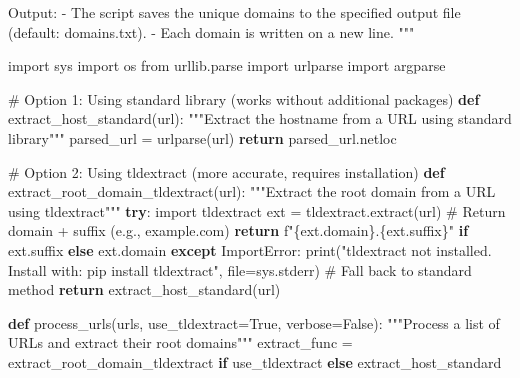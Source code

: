 \documentclass[
  titlepage]{article}
\newenvironment{Shaded}{\begin{snugshade}}{\end{snugshade}}
\newcommand{\BuiltInTok}[1]{\textcolor[rgb]{0.00,0.23,0.31}{#1}}
\newcommand{\CommentTok}[1]{\textcolor[rgb]{0.37,0.37,0.37}{#1}}
\newcommand{\ControlFlowTok}[1]{\textcolor[rgb]{0.00,0.23,0.31}{\textbf{#1}}}
\newcommand{\ImportTok}[1]{\textcolor[rgb]{0.00,0.46,0.62}{#1}}
\newcommand{\KeywordTok}[1]{\textcolor[rgb]{0.00,0.23,0.31}{\textbf{#1}}}
\newcommand{\NormalTok}[1]{\textcolor[rgb]{0.00,0.23,0.31}{#1}}
\newcommand{\OperatorTok}[1]{\textcolor[rgb]{0.37,0.37,0.37}{#1}}
\newcommand{\PreprocessorTok}[1]{\textcolor[rgb]{0.68,0.00,0.00}{#1}}
\newcommand{\SpecialCharTok}[1]{\textcolor[rgb]{0.37,0.37,0.37}{#1}}
\newcommand{\SpecialStringTok}[1]{\textcolor[rgb]{0.13,0.47,0.30}{#1}}
\newcommand{\StringTok}[1]{\textcolor[rgb]{0.13,0.47,0.30}{#1}}
\newcommand{\VariableTok}[1]{\textcolor[rgb]{0.07,0.07,0.07}{#1}}
\begin{document}
\begin{Shaded}
\begin{Highlighting}[]
\CommentTok{Output:}
\CommentTok{{-} The script saves the unique domains to the specified output file (default: domains.txt).}
\CommentTok{{-} Each domain is written on a new line.}
\CommentTok{"""}

\ImportTok{import}\NormalTok{ sys}
\ImportTok{import}\NormalTok{ os}
\ImportTok{from}\NormalTok{ urllib.parse }\ImportTok{import}\NormalTok{ urlparse}
\ImportTok{import}\NormalTok{ argparse}

\CommentTok{\# Option 1: Using standard library (works without additional packages)}
\KeywordTok{def}\NormalTok{ extract\_host\_standard(url):}
    \CommentTok{"""Extract the hostname from a URL using standard library"""}
\NormalTok{    parsed\_url }\OperatorTok{=}\NormalTok{ urlparse(url)}
    \ControlFlowTok{return}\NormalTok{ parsed\_url.netloc}

\CommentTok{\# Option 2: Using tldextract (more accurate, requires installation)}
\KeywordTok{def}\NormalTok{ extract\_root\_domain\_tldextract(url):}
    \CommentTok{"""Extract the root domain from a URL using tldextract"""}
    \ControlFlowTok{try}\NormalTok{:}
        \ImportTok{import}\NormalTok{ tldextract}
\NormalTok{        ext }\OperatorTok{=}\NormalTok{ tldextract.extract(url)}
        \CommentTok{\# Return domain + suffix (e.g., example.com)}
        \ControlFlowTok{return} \SpecialStringTok{f"}\SpecialCharTok{\{}\NormalTok{ext}\SpecialCharTok{.}\NormalTok{domain}\SpecialCharTok{\}}\SpecialStringTok{.}\SpecialCharTok{\{}\NormalTok{ext}\SpecialCharTok{.}\NormalTok{suffix}\SpecialCharTok{\}}\SpecialStringTok{"} \ControlFlowTok{if}\NormalTok{ ext.suffix }\ControlFlowTok{else}\NormalTok{ ext.domain}
    \ControlFlowTok{except} \PreprocessorTok{ImportError}\NormalTok{:}
        \BuiltInTok{print}\NormalTok{(}\StringTok{"tldextract not installed. Install with: pip install tldextract"}\NormalTok{, }\BuiltInTok{file}\OperatorTok{=}\NormalTok{sys.stderr)}
        \CommentTok{\# Fall back to standard method}
        \ControlFlowTok{return}\NormalTok{ extract\_host\_standard(url)}

\KeywordTok{def}\NormalTok{ process\_urls(urls, use\_tldextract}\OperatorTok{=}\VariableTok{True}\NormalTok{, verbose}\OperatorTok{=}\VariableTok{False}\NormalTok{):}
    \CommentTok{"""Process a list of URLs and extract their root domains"""}
\NormalTok{    extract\_func }\OperatorTok{=}\NormalTok{ extract\_root\_domain\_tldextract }\ControlFlowTok{if}\NormalTok{ use\_tldextract }\ControlFlowTok{else}\NormalTok{ extract\_host\_standard}
    

\end{Highlighting}
\end{Shaded}
\end{document}

